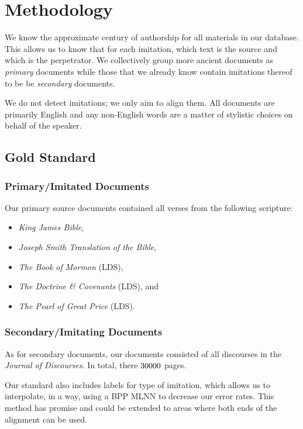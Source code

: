 \section {Methodology}

We know the approximate century of authorship for all materials in our database. This allows us to know that for each imitation, which text is the source and which is the perpetrator. We collectively group more ancient documents as \textit{primary} documents while those that we already know contain imitations thereof to be be \textit{secondary} documents.

We do not detect imitations; we only aim to align them.  All documents are primarily English and any non-English words are a matter of stylistic choices on behalf of the speaker.  

\subsection{Gold Standard}
\subsubsection{Primary/Imitated Documents}
Our primary source documents contained all verses from the following scripture:
	\begin{itemize}
		\item \textit{King James Bible},
		\item \textit{Joseph Smith Translation of the Bible},
		\item \textit{The Book of Mormon} (LDS),
		\item \textit{The Doctrine \& Covenants} (LDS), and
		\item \textit{The Pearl of Great Price} (LDS). 
	\end{itemize}

\subsubsection{Secondary/Imitating Documents}
As for secondary documents, our documents consisted of all discourses in the \textit{Journal of Discourses}. In total, there $30000$ pages.

Our standard also includes labels for type of imitation, which allows us to interpolate, in a way, using a BPP MLNN to decrease our error rates. This method has promise and could be extended to areas where both ends of the alignment can be used.

